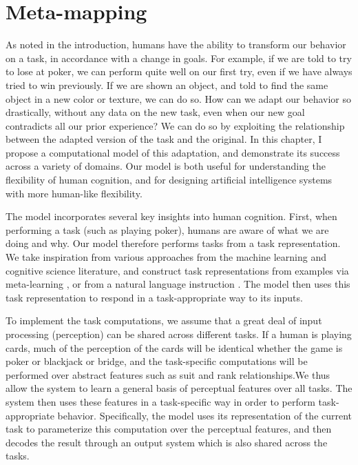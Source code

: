 \chapter{Meta-mapping} \label{chapter:zero_shot_via_homm}

As noted in the introduction, humans have the ability to transform our behavior on a task, in accordance with a change in goals. For example, if we are told to try to lose at poker, we can perform quite well on our first try, even if we have always tried to win previously. If we are shown an object, and told to find the same object in a new color or texture, we can do so. How can we adapt our behavior so drastically, without any data on the new task, even when our new goal contradicts all our prior experience? We can do so by exploiting the relationship between the adapted version of the task and the original. In this chapter, I propose a computational model of this adaptation, and demonstrate its success across a variety of domains. Our model is both useful for understanding the flexibility of human cognition, and for designing artificial intelligence systems with more human-like flexibility.   

The model incorporates several key insights into human cognition. First, when performing a task (such as playing poker), humans are aware of what we are doing and why. Our model therefore performs tasks from a task representation. We take inspiration from various approaches from the machine learning and cognitive science literature, and construct task representations from examples via meta-learning \citep[e.g.][]{Vinyals2016, Santoro2016, Finn2017a, Finn2018, Stadie2018, Botvinick2019}, or from a natural language instruction \citep{Larochelle2008, Hermann2017, Hill2019a}. The model then uses this task representation to respond in a task-appropriate way to its inputs. 

To implement the task computations, we assume that a great deal of input processing (perception) can be shared across different tasks. If a human is playing cards, much of the perception of the cards will be identical whether the game is poker or blackjack or bridge, and the task-specific computations will be performed over abstract features such as suit and rank relationships.We thus allow the system to learn a general basis of perceptual features over all tasks. The system then uses these features in a task-specific way in order to perform task-appropriate behavior. Specifically, the model uses its representation of the current task to parameterize this computation over the perceptual features, and then decodes the result through an output system which is also shared across the tasks. 

